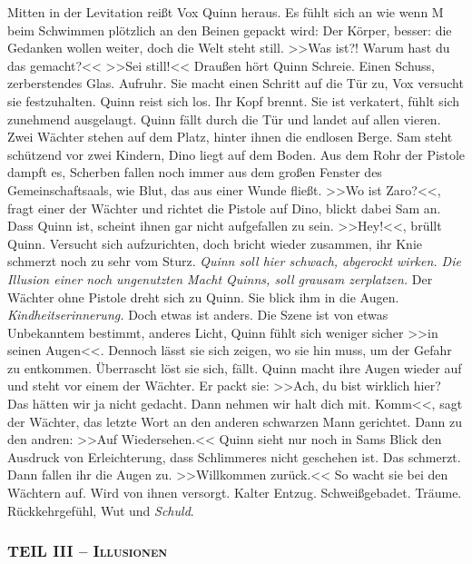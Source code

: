 %
Mitten in der Levitation reißt Vox Quinn heraus.
Es fühlt sich an wie wenn M beim Schwimmen plötzlich an den Beinen gepackt wird:
Der Körper, besser: die Gedanken wollen weiter, doch die Welt steht
still.
>>Was ist?! Warum hast du das gemacht?<< 
>>Sei still!<< 
Draußen hört Quinn Schreie. 
Einen Schuss, zerberstendes Glas. 
Aufruhr.
Sie macht einen Schritt auf die Tür zu, Vox versucht sie festzuhalten. 
Quinn reist sich los. 
Ihr Kopf brennt. 
Sie ist verkatert, fühlt sich zunehmend ausgelaugt. 
Quinn fällt durch die Tür und landet auf allen vieren. 
Zwei Wächter stehen auf dem Platz, hinter ihnen die endlosen Berge. 
Sam steht schützend vor zwei Kindern, Dino liegt auf dem Boden. 
Aus dem Rohr der Pistole dampft es, Scherben fallen noch immer aus dem großen
Fenster des Gemeinschaftsaals, wie Blut, das aus einer Wunde fließt. 
>>Wo ist Zaro?<<, fragt einer der Wächter und richtet die Pistole auf Dino,
blickt dabei Sam an. 
Dass Quinn  ist, scheint ihnen gar nicht aufgefallen zu sein. 
>>Hey!<<, brüllt Quinn. 
Versucht sich aufzurichten, doch bricht wieder zusammen, ihr Knie schmerzt noch
zu sehr vom Sturz. \emph{Quinn soll hier schwach, abgerockt wirken. 
Die Illusion einer noch ungenutzten Macht Quinns, soll grausam zerplatzen.} 
Der Wächter ohne Pistole dreht sich zu Quinn. 
Sie blick ihm in die Augen. 
\emph{Kindheitserinnerung.}
Doch etwas ist anders. 
Die Szene ist von etwas Unbekanntem bestimmt, anderes Licht, Quinn fühlt sich
weniger sicher >>in seinen Augen<<. 
Dennoch lässt sie sich zeigen, wo sie hin muss, um der Gefahr zu entkommen. 
Überrascht löst sie sich, fällt. 
Quinn macht ihre Augen wieder auf und steht vor einem der Wächter. 
Er packt sie: >>Ach, du bist wirklich hier? 
Das hätten wir ja nicht gedacht. 
Dann nehmen wir halt dich mit.
Komm<<, sagt der Wächter, das letzte Wort an den anderen schwarzen Mann
gerichtet. 
Dann zu den andren: >>Auf Wiedersehen.<<
Quinn sieht nur noch in Sams Blick den Ausdruck von Erleichterung, dass
Schlimmeres nicht geschehen ist. 
Das schmerzt. 
Dann fallen ihr die Augen zu. 
>>Willkommen zurück.<< 
So wacht sie bei den Wächtern auf. 
Wird von ihnen versorgt. 
Kalter Entzug. 
Schweißgebadet. 
Träume. 
Rückkehrgefühl, Wut und \emph{Schuld}. 

\subsubsection{\textsc{TEIL III -- Illusionen}}

